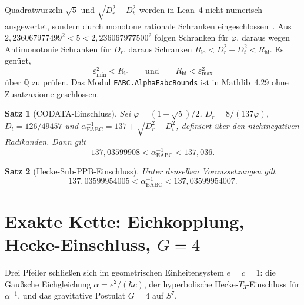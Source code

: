 \documentclass[11pt,a4paper]{article}
\newtheorem{theorem}{Satz}
\begin{document}
Quadratwurzeln $\sqrt{5}$ und $\sqrt{D_r^2-D_t^2}$ werden in Lean~4 nicht numerisch ausgewertet, sondern durch monotone rationale Schranken eingeschlossen~\cite{deMoura2021,mathlib}.
Aus
$2{,}236067977499^2<5<2{,}236067977500^2$
folgen Schranken für $\varphi$, daraus wegen Antimonotonie Schranken für $D_r$, daraus Schranken $R_{\mathrm{lo}}<D_r^2-D_t^2<R_{\mathrm{hi}}$.
Es genügt,
\begin{equation}
\varepsilon_{\min}^2<R_{\mathrm{lo}}\qquad\text{und}\qquad R_{\mathrm{hi}}<\varepsilon_{\max}^2
\end{equation}
über $\mathbb{Q}$ zu prüfen.
Das Modul \texttt{EABC.AlphaEabcBounds} ist in Mathlib~4.29 ohne Zusatzaxiome geschlossen.

\begin{theorem}[CODATA-Einschluss]
Sei $\varphi=(1+\sqrt{5})/2$, $D_r=8/(137\varphi)$, $D_t=126/49457$ und
$\alpha^{-1}_{\mathrm{EABC}}=137+\sqrt{D_r^2-D_t^2}$, definiert über den nichtnegativen Radikanden.
Dann gilt
\[
137{,}03599908<\alpha^{-1}_{\mathrm{EABC}}<137{,}036.
\]
\end{theorem}

\begin{theorem}[Hecke-Sub-PPB-Einschluss]
Unter denselben Voraussetzungen gilt
\[
137{,}03599954005<\alpha^{-1}_{\mathrm{EABC}}<137{,}03599954007.
\]
\end{theorem}

\section{Exakte Kette: Eichkopplung, Hecke-Einschluss, $G=4$}

Drei Pfeiler schließen sich im geometrischen Einheitensystem $e=c=1$:
die Gaußsche Eichgleichung $\alpha=e^2/(\hbar c)$,
der hyperbolische Hecke-$T_3$-Einschluss für $\alpha^{-1}$,
und das gravitative Postulat $G=4$ auf $S^7$.
\end{document}
